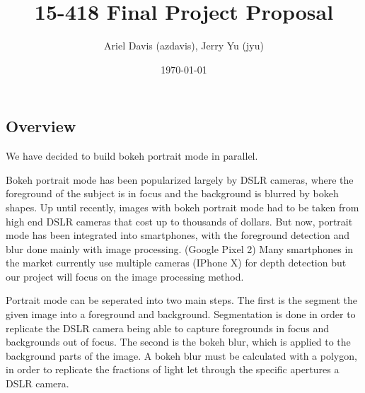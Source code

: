 \documentclass[12pt]{article}
\author{Ariel Davis (azdavis), Jerry Yu (jyu)}
\date{\today}
\title{15-418 Final Project Proposal}
\begin{document}
\maketitle

\subsection*{Overview}
We have decided to build bokeh portrait mode in parallel.

Bokeh portrait mode has been popularized largely by DSLR cameras, where the
foreground of the subject is in focus and the background is blurred by bokeh
shapes. Up until recently, images with bokeh portrait mode had to be taken
from high end DSLR cameras that cost up to thousands of dollars. But now,
portrait mode has been integrated into smartphones, with the foreground
detection and blur done mainly with image processing. (Google Pixel 2) Many
smartphones in the market currently use multiple cameras (IPhone X) for
depth detection but our project will focus on the image processing method.

Portrait mode can be seperated into two main steps. The first is the segment
the given image into a foreground and background. Segmentation is done in order
to replicate the DSLR camera being able to capture foregrounds in focus and
backgrounds out of focus.
The second is the bokeh blur, which is applied to the background parts of the
image. A bokeh blur must be calculated with a polygon, in order to replicate the
fractions of light let through the specific apertures a DSLR camera.
\end{document}
